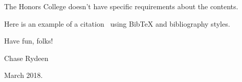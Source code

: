 The Honors College doesn't have specific requirements about the contents.

Here is an example of a citation~\citep{stone1968iterative} using BibTeX and bibliography styles.

Have fun, folks!

Chase Rydeen

March 2018.
